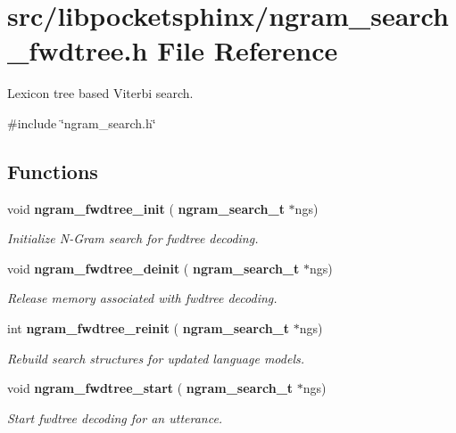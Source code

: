 \section{src/libpocketsphinx/ngram\+\_\+search\+\_\+fwdtree.h File Reference}
\label{ngram__search__fwdtree_8h}


Lexicon tree based Viterbi search.  


{\ttfamily \#include \char`\"{}ngram\+\_\+search.\+h\char`\"{}}\newline
\subsection*{Functions}
\begin{DoxyCompactItemize}
\item 
\mbox{\label{ngram__search__fwdtree_8h_a72c89a2a1f189495abee00e1853cddcc}} 
void \textbf{ ngram\+\_\+fwdtree\+\_\+init} (\textbf{ ngram\+\_\+search\+\_\+t} $\ast$ngs)
\begin{DoxyCompactList}\small\item\em Initialize N-\/\+Gram search for fwdtree decoding. \end{DoxyCompactList}\item 
\mbox{\label{ngram__search__fwdtree_8h_a0e0e0436b30e1074114e1d37991c5d6b}} 
void \textbf{ ngram\+\_\+fwdtree\+\_\+deinit} (\textbf{ ngram\+\_\+search\+\_\+t} $\ast$ngs)
\begin{DoxyCompactList}\small\item\em Release memory associated with fwdtree decoding. \end{DoxyCompactList}\item 
\mbox{\label{ngram__search__fwdtree_8h_aa53827b47025d4e7a63f3ddce763d84e}} 
int \textbf{ ngram\+\_\+fwdtree\+\_\+reinit} (\textbf{ ngram\+\_\+search\+\_\+t} $\ast$ngs)
\begin{DoxyCompactList}\small\item\em Rebuild search structures for updated language models. \end{DoxyCompactList}\item 
\mbox{\label{ngram__search__fwdtree_8h_af736200cd01a5d743dbab447ecc85d08}} 
void \textbf{ ngram\+\_\+fwdtree\+\_\+start} (\textbf{ ngram\+\_\+search\+\_\+t} $\ast$ngs)
\begin{DoxyCompactList}\small\item\em Start fwdtree decoding for an utterance. \end{DoxyCompactList}\item 

\end{DoxyCompactItemize}
